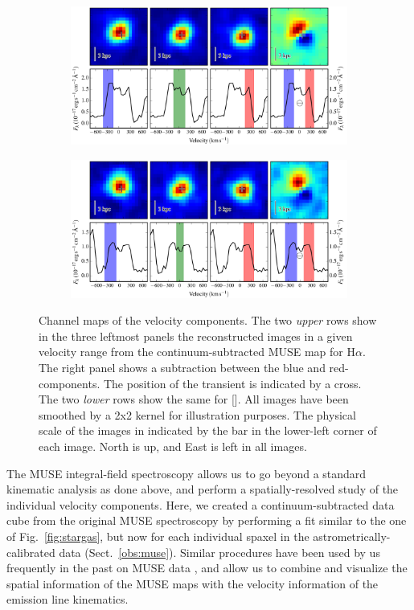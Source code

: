 \documentclass[traditabstract]{aa}
\newcommand{\ha}{H$\alpha$}
\newcommand{\nii}{[\ion{N}{ii}]}
\begin{document}
\begin{figure}
\begin{subfigure}{.49\textwidth}
  \includegraphics[width=0.999\linewidth]{fig/MUSE_Ha_channelmaps.pdf}
\end{subfigure}
\begin{subfigure}{.49\textwidth}
  \includegraphics[width=0.999\linewidth]{fig/MUSE_NII_channelmaps.pdf}
\end{subfigure}

\caption{Channel maps of the velocity components. The two \textit{upper} rows show in the three leftmost panels the reconstructed images in a given velocity range from the continuum-subtracted MUSE map for \ha. The right panel shows a subtraction between the blue and red-components. The position of the transient is indicated by a cross. The two \textit{lower} rows show the same for \nii. All images have been smoothed by a 2x2 kernel for illustration purposes. The physical scale of the images in indicated by the bar in the lower-left corner of each image. North is up, and East is left in all images.}
\label{fig:channelmaps}
\end{figure}

The MUSE integral-field spectroscopy allows us to go beyond a standard kinematic analysis as done above, and perform a spatially-resolved study of the individual velocity components. Here, we created a continuum-subtracted data cube from the original MUSE spectroscopy by performing a fit similar to the one of Fig.~\ref{fig:stargas}, but now for each individual spaxel in the astrometrically-calibrated data (Sect.~\ref{obs:muse}). Similar procedures have been used by us frequently in the past on MUSE data \citep{2016MNRAS.455.4087G, 2016ApJ...830L..32P, 2017arXiv170205430K}, and allow us to combine and visualize the spatial information of the MUSE maps with the velocity information of the emission line kinematics.
\end{document}
